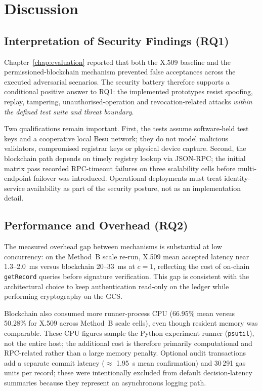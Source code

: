 
\chapter{Discussion}
\label{chap:discussion}

\section{Interpretation of Security Findings (RQ1)}
\label{sec:disc-rq1}

Chapter~\ref{chap:evaluation} reported that both the X.509 baseline and the permissioned-blockchain mechanism prevented false acceptances across the executed adversarial scenarios. The security battery therefore supports a conditional positive answer to RQ1: the implemented prototypes resist spoofing, replay, tampering, unauthorised-operation and revocation-related attacks \emph{within the defined test suite and threat boundary}.

Two qualifications remain important. First, the tests assume software-held test keys and a cooperative local Besu network; they do not model malicious validators, compromised registrar keys or physical device capture. Second, the blockchain path depends on timely registry lookup via JSON-RPC; the initial matrix pass recorded RPC-timeout failures on three scalability cells before multi-endpoint failover was introduced. Operational deployments must treat identity-service availability as part of the security posture, not as an implementation detail.

\section{Performance and Overhead (RQ2)}
\label{sec:disc-rq2}

The measured overhead gap between mechanisms is substantial at low concurrency: on the Method~B scale re-run, X.509 mean accepted latency near 1.3--2.0~ms versus blockchain 20--33~ms at $c=1$, reflecting the cost of on-chain \texttt{getRecord} queries before signature verification. This gap is consistent with the architectural choice to keep authentication read-only on the ledger while performing cryptography on the GCS.

Blockchain also consumed more runner-process CPU (66.95\% mean versus 50.28\% for X.509 across Method~B scale cells), even though resident memory was comparable. These CPU figures sample the Python experiment runner (\texttt{psutil}), not the entire host; the additional cost is therefore primarily computational and RPC-related rather than a large memory penalty. Optional audit transactions add a separate commit latency ($\approx$ 1.95~s mean confirmation) and 30\,291 gas units per record; these were intentionally excluded from default decision-latency summaries because they represent an asynchronous logging path.

